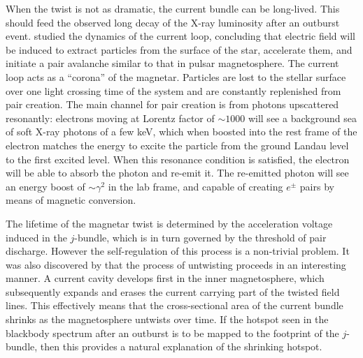 When the twist is not as dramatic, the current bundle can be long-lived. This
should feed the observed long decay of the X-ray luminosity after an outburst
event. \citet{beloborodov_corona_2007} studied the dynamics of the current loop,
concluding that electric field will be induced to extract particles from the
surface of the star, accelerate them, and initiate a pair avalanche similar to
that in pulsar magnetosphere. The current loop acts as a ``corona'' of the
magnetar. Particles are lost to the stellar surface over one light crossing time
of the system and are constantly replenished from pair creation. The main
channel for pair creation is from photons upscattered resonantly: electrons
moving at Lorentz factor of $\sim 1000$ will see a background sea of soft X-ray
photons of a few keV, which when boosted into the rest frame of the electron
matches the energy to excite the particle from the ground Landau level to the
first excited level. When this resonance condition is satisfied, the electron
will be able to absorb the photon and re-emit it. The re-emitted photon will see
an energy boost of $\sim \gamma^{2}$ in the lab frame, and capable of creating
$e^{\pm}$ pairs by means of magnetic conversion.

The lifetime of the magnetar twist is determined by the acceleration voltage
induced in the $j$-bundle, which is in turn governed by the threshold of pair
discharge. However the self-regulation of this process is a non-trivial problem.
It was also discovered by \citet{beloborodov_untwisting_2009} that the process
of untwisting proceeds in an interesting manner. A current cavity develops first
in the inner magnetosphere, which subsequently expands and erases the current
carrying part of the twisted field lines. This effectively means that the
cross-sectional area of the current bundle shrinks as the magnetosphere untwists
over time. If the hotspot seen in the blackbody spectrum after an outburst is to
be mapped to the footprint of the $j$-bundle, then this provides a natural
explanation of the shrinking hotspot.

